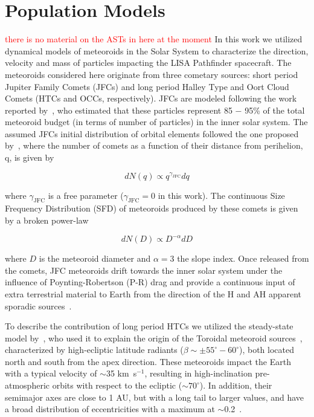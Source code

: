 \documentclass[twocolumn, trackchanges]{aastex62}
\newcommand{\red}[1]{\textcolor{red}{#1}}
\begin{document}
\section{Population Models}\label{sec:models}
\red{there is no material on the ASTs in here at the moment}
In this work we utilized dynamical models of meteoroids in the Solar System to characterize the direction, velocity and mass of particles impacting the LISA Pathfinder spacecraft.
The meteoroids considered here originate from three cometary sources: short period Jupiter Family Comets (JFCs) and long period Halley Type and Oort Cloud Comets (HTCs and OCCs, respectively). JFCs are modeled following the work  reported by~\cite{Nesvorny10,Nesvorny11a}, who estimated that these particles represent 85 $-$ 95\% of the total meteoroid budget (in terms of number of particles) in the inner solar system. The assumed JFCs initial distribution of orbital elements followed the one proposed by~\cite{LevisonDuncan97}, where the number of comets as a function of their distance from perihelion, q, is given by

\begin{equation}
dN(q)\propto q^{\gamma_\mathrm{JFC}} dq\label{nq}
\end{equation}

\noindent where $\gamma_\mathrm{JFC}$ is a free parameter ($\gamma_\mathrm{JFC} = 0$ in this work). The continuous Size Frequency Distribution (SFD) of meteoroids produced by these comets is given by a broken power-law

\begin{equation}
dN(D)\propto D^{-\alpha}dD\label{nd}
\end{equation}

\noindent where $D$ is the meteoroid diameter and $\alpha=3$ the slope index. Once released from the comets, JFC meteoroids drift towards the inner solar system under the influence of Poynting-Robertson (P-R) drag and provide a continuous input of extra terrestrial material to Earth from the direction of the H and AH apparent sporadic sources~\cite[][]{JonesBrown93,Nesvorny10}.

To describe the contribution of long period HTCs we utilized the steady-state model by~\cite{Pokorny14}, who used it to explain the origin of the Toroidal meteoroid sources~\cite[][]{JonesBrown93,CampbellBrown09,Janches15}, characterized by high-ecliptic latitude radiants ($\beta\sim\pm 55^{\circ} - 60^{\circ}$), both located north and south from the apex direction. These meteoroids impact the Earth with a typical velocity of $\sim$35 km~s$^{-1}$, resulting in high-inclination pre-atmospheric orbits with respect to the ecliptic ($\sim70^{\circ}$). In addition, their semimajor axes are close to 1 AU, but with a long tail to larger values, and have a broad distribution of eccentricities with a maximum at $\sim$0.2~\cite[See Figure 13 in][]{Janches15}. 
\end{document}
